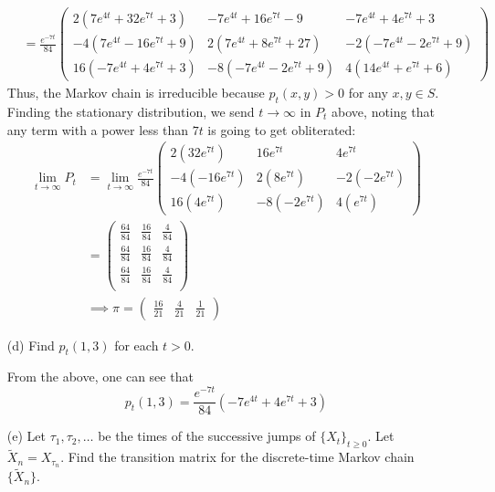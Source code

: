 \documentclass[11pt]{article}
\begin{document}
\begin{enumerate}
\begin{solution}
\begin{align*}
        &= \frac{e^{-7t}}{84}
\begin{pmatrix}
2\left(7 e^{4t} + 32 e^{7t} + 3\right) & -7 e^{4t} + 16 e^{7t} - 9 & -7 e^{4t} + 4 e^{7t} + 3 \\
-4\left(7 e^{4t} - 16 e^{7t} + 9\right) & 2\left(7 e^{4t} + 8 e^{7t} + 27\right) & -2\left(-7 e^{4t} - 2 e^{7t} + 9\right) \\
16\left(-7 e^{4t} + 4 e^{7t} + 3\right) & -8\left(-7 e^{4t} - 2 e^{7t} + 9\right) & 4\left(14 e^{4t} + e^{7t} + 6\right)
\end{pmatrix}
    \end{align*}
    Thus, the Markov chain is irreducible because $p_t(x,y) >0$ for any $x,y \in S.$ Finding the stationary distribution, we send $t\to \infty$ in $P_t$ above, noting that any term with a power less than $7t$ is going to get obliterated:
\begin{align*}
    \lim_{t\to \infty}P_t &= \lim_{t\to \infty} \frac{e^{-7t}}{84}
\begin{pmatrix} 
2\left(32 e^{7t}\right) & 16 e^{7t}& 4e^{7t} \\
-4\left( - 16 e^{7t}\right) & 2\left(8 e^{7t} \right) & -2\left(- 2 e^{7t} \right) \\
16\left(4 e^{7t}\right) & -8\left(- 2 e^{7t} \right) & 4\left( e^{7t}\right)
\end{pmatrix}\\
&= \begin{pmatrix}
    \frac{64}{84} & \frac{16}{84} & \frac{4}{84}\\
    \frac{64}{84} & \frac{16}{84} & \frac{4}{84}\\
    \frac{64}{84} & \frac{16}{84} & \frac{4}{84}\\
\end{pmatrix}\\
&\implies \pi = \begin{pmatrix}
    \frac{16}{21} & \frac{4}{21} & \frac{1}{21}
\end{pmatrix}
\end{align*}
\end{solution}
    \item[(d)] Find \(p_t(1,3)\) for each \(t > 0\).
    \begin{solution}
        From the above, one can see that 
        \[p_t (1,3) = \frac{e^{-7t}}{84}(-7 e^{4t} + 4 e^{7t} + 3 )\]
    \end{solution}
    \item[(e)] Let \(\tau_1, \tau_2, \ldots\) be the times of the successive jumps of \(\{X_t\}_{t \geq 0}\). Let \(\tilde{X}_n = X_{\tau_n}\). Find the transition matrix for the discrete-time Markov chain \(\{\tilde{X}_n\}\).
\end{enumerate}
\end{document}
